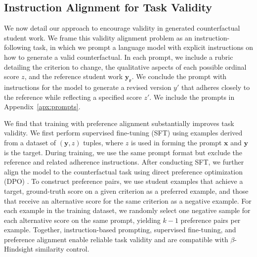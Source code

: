 \documentclass[11pt]{article}
\begin{document}
\subsection{Instruction Alignment for Task Validity} \label{train-setup}

We now detail our approach to encourage validity in generated counterfactual student work. We frame this validity alignment problem as an instruction-following task, in which we prompt a language model with explicit instructions on how to generate a valid counterfactual. In each prompt, we include a rubric detailing the criterion to change, the qualitative aspects of each possible ordinal score $z$, and the reference student work $\mathbf{y_r}$. We conclude the prompt with instructions for the model to generate a revised version $y'$ that adheres closely to the reference while reflecting a specified score $z'$. We include the prompts in Appendix~\ref{apx:prompts}.

We find that training with preference alignment substantially improves task validity. We first perform supervised fine-tuning (SFT) \cite{ouyang2022training} using examples derived from a dataset of $(\mathbf{y}, z)$ tuples, where $z$ is used in forming the prompt $\textbf{x}$ and $\textbf{y}$ is the target. During training, we use the same prompt format but exclude the reference and related adherence instructions. After conducting SFT, we further align the model to the counterfactual task using direct preference optimization (DPO) \cite{rafailov2023direct}. To construct preference pairs, we use student examples that achieve a target, ground-truth score on a given criterion as a preferred example, and those that receive an alternative score for the same criterion as a negative example. For each example in the training dataset, we randomly select one negative sample for each alternative score on the same prompt, yielding $k-1$ preference pairs per example. Together, instruction-based prompting, supervised fine-tuning, and preference alignment enable reliable task validity and are compatible with $\beta$-Hindsight similarity control.


\end{document}
